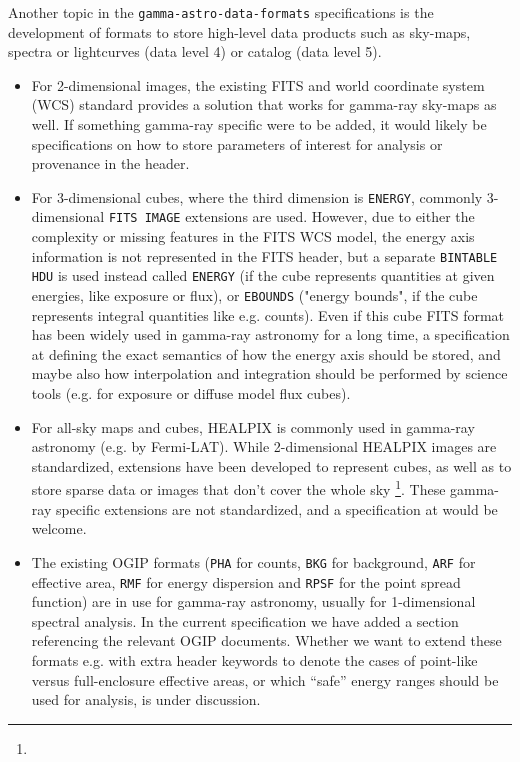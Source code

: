 Another topic in the \texttt{gamma-astro-data-formats} specifications is the development of formats to store high-level data products such as sky-maps, spectra or lightcurves (data level 4) or catalog (data level 5).

\begin{itemize}
\item{} For 2-dimensional images, the existing FITS and world coordinate system (WCS) standard provides a solution that works for gamma-ray sky-maps as well. If something gamma-ray specific were to be added, it would likely be specifications on how to store parameters of interest for analysis or provenance in the header.
\item{} For 3-dimensional cubes, where the third dimension is \texttt{ENERGY}, commonly 3-dimensional \texttt{FITS IMAGE} extensions are used. However, due to either the complexity or missing features in the FITS WCS model, the energy axis information is not represented in the FITS header, but a separate \texttt{BINTABLE HDU} is used instead called \texttt{ENERGY} (if the cube represents quantities at given energies, like exposure or flux), or \texttt{EBOUNDS} ("energy bounds", if the cube represents integral quantities like e.g. counts).
Even if this cube FITS format has been widely used in gamma-ray astronomy for a long time, a specification at \gadf defining the exact semantics of how the energy axis should be stored, and maybe also how interpolation and integration should be performed by science tools (e.g. for exposure or diffuse model flux cubes).
\item{} For all-sky maps and cubes, HEALPIX is commonly used in gamma-ray astronomy (e.g. by Fermi-LAT). While 2-dimensional HEALPIX images are standardized, extensions have been developed to represent cubes, as well as to store sparse data or images that don't cover the whole sky \footnote{\pointlikedata}. These gamma-ray specific extensions are not standardized, and a specification at \gadf would be welcome.
\item{} The existing OGIP formats (\texttt{PHA} for counts, \texttt{BKG} for background, \texttt{ARF} for effective area, \texttt{RMF} for energy dispersion and \texttt{RPSF} for the point spread function) are in use for gamma-ray astronomy, usually for 1-dimensional spectral analysis. In the current specification we have added a section referencing the relevant OGIP documents. Whether we want to extend these formats e.g. with extra header keywords to denote the cases of point-like versus full-enclosure effective areas, or which ``safe'' energy ranges should be used for analysis, is under discussion.

\end{itemize}
